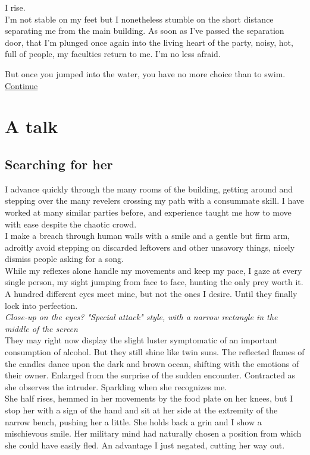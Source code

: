 \documentclass{report}
\newcommand{\dcomment}[1]{
	\emph{#1}
	\\
}
\newcommand{\glink}[2]{
	\hyperref[#1]{#2}
}
\newcommand{\gsection}[1]{
	\section*{#1}
	\label{#1}
}
\begin{document}
I rise.\\

I'm not stable on my feet but I nonetheless stumble on the short distance separating me from the main building. As soon as I've passed the separation door, that I'm plunged once again into the living heart of the party, noisy, hot, full of people, my faculties return to me. I'm no less afraid.

But once you jumped into the water, you have no more choice than to swim.\\

\glink{Searching for her}{Continue}\\

\chapter*{A talk}

\gsection{Searching for her}

I advance quickly through the many rooms of the building, getting around and stepping over the many revelers crossing my path with a consummate skill. I have worked at many similar parties before, and experience taught me how to move with ease despite the chaotic crowd.\\

I make a breach through human walls with a smile and a gentle but firm arm, adroitly avoid stepping on discarded leftovers and other unsavory things, nicely dismiss people asking for a song.\\

While my reflexes alone handle my movements and keep my pace, I gaze at every single person, my sight jumping from face to face, hunting the only prey worth it. A hundred different eyes meet mine, but not the ones I desire. Until they finally lock into perfection.\\

\dcomment{
	Close-up on the eyes? "Special attack" style, with a narrow rectangle in the middle of the screen
}

They may right now display the slight luster symptomatic of an important consumption of alcohol. But they still shine like twin suns. The reflected flames of the candles dance upon the dark and brown ocean, shifting with the emotions of their owner. Enlarged from the surprise of the sudden encounter. Contracted as she observes the intruder. Sparkling when she recognizes me.\\

She half rises, hemmed in her movements by the food plate on her knees, but I stop her with a sign of the hand and sit at her side at the extremity of the narrow bench, pushing her a little. She holds back a grin and I show a mischievous smile. Her military mind had naturally chosen a position from which she could have easily fled. An advantage I just negated, cutting her way out.\\
\end{document}

